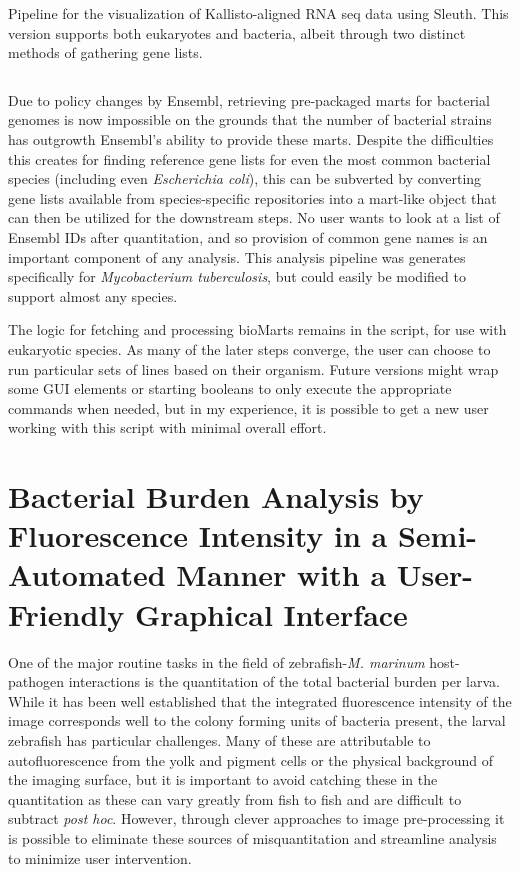 \begin{code}
\caption{Pipeline for the visualization of Kallisto-aligned RNA seq data using Sleuth. This version supports both eukaryotes and bacteria, albeit through two distinct methods of gathering gene lists.}
\label{blinder}

\inputminted[breaklines,frame=single,fontsize=\small]{r}{source/sleuther.R}

\end{code}

Due to policy changes by Ensembl, retrieving pre-packaged marts for bacterial genomes is now impossible on the grounds that the number of bacterial strains has outgrowth Ensembl's ability to provide these marts. Despite the difficulties this creates for finding reference gene lists for even the most common bacterial species (including even \textit{Escherichia coli}), this can be subverted by converting gene lists available from species-specific repositories into a mart-like object that can then be utilized for the downstream steps. No user wants to look at a list of Ensembl IDs after quantitation, and so provision of common gene names is an important component of any analysis. This analysis pipeline was generates specifically for \textit{Mycobacterium tuberculosis}, but could easily be modified to support almost any species.

The logic for fetching and processing bioMarts remains in the script, for use with eukaryotic species. As many of the later steps converge, the user can choose to run particular sets of lines based on their organism. Future versions might wrap some GUI elements or starting booleans to only execute the appropriate commands when needed, but in my experience, it is possible to get a new user working with this script with minimal overall effort.

\section{Bacterial Burden Analysis by Fluorescence Intensity in a Semi-Automated Manner with a User-Friendly Graphical Interface}

One of the major routine tasks in the field of zebrafish-\textit{M. marinum} host-pathogen interactions is the quantitation of the total bacterial burden per larva. While it has been well established that the integrated fluorescence intensity of the image corresponds well to the colony forming units of bacteria present, the larval zebrafish has particular challenges. Many of these are attributable to autofluorescence from the yolk and pigment cells or the physical background of the imaging surface, but it is important to avoid catching these in the quantitation as these can vary greatly from fish to fish and are difficult to subtract \textit{post hoc}. However, through clever approaches to image pre-processing it is possible to eliminate these sources of misquantitation and streamline analysis to minimize user intervention.


